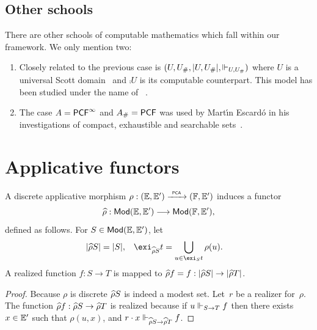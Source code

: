 \subsection{Other schools}
\label{sec:other-schools}

There are other schools of computable mathematics which fall within
our framework. We only mention two:
%
\begin{enumerate}
\item
  Closely related to the previous case is $(U, U_{\#}, |U, U_{\#}|, {\Vdash_{U, U_{\#}}})$ where
  $U$ is a universal Scott domain~ and $\comp{U}$ is
  its computable counterpart. This model has been studied under the
  name of ~.
\item
  The case $A = \mathsf{PCF}^\infty$ and $A_{\#} = \mathsf{PCF}$ was used by
  Mart{\'\i}n Escard\'o in his investigations of compact, exhaustible
  and searchable sets~.
\end{enumerate}

\section{Applicative functors}
\label{sec:applicative-functors}

\begin{proposition}
  \label{th:applicative_morphism_induce_functor}%
  A discrete applicative morphism $\rho: ({\mathbb{E}}, {\mathbb{E}'}) \xrightarrow{\scriptscriptstyle\mathsf{\ PCA\ }}{} ({\mathbb{F}},
  {\mathbb{E}'})$ induces a functor
  \begin{equation*}
     \widehat{\rho}: \mathsf{Mod}({\mathbb{E}}, {\mathbb{E}'}) \longrightarrow \mathsf{Mod}({\mathbb{F}}, {\mathbb{E}'}),
  \end{equation*}
  defined as follows. For $S \in \mathsf{Mod}({\mathbb{E}}, {\mathbb{E}'})$, let
  \begin{align*}
    |\ff{\rho} S| &= |S|,
    &
    \exi_{\ff{\rho} S} t &= \bigcup_{u \in \exi_S t} \rho(u).
  \end{align*}
  A realized function $f: S \to T$ is mapped to $\widehat{\rho} f = f:
  |\widehat{\rho} S| \to |\widehat{\rho} T|$.
\end{proposition}

\begin{proof}
  Because $\rho$ is discrete $\widehat{\rho} S$ is indeed a modest set.
  Let~$r$ be a realizer for~$\rho$. The function $\widehat{\rho} f :
  \widehat{\rho} S \to \widehat{\rho} T$ is realized because if $u \Vdash_{S \to T}
  f$ then there exists $x \in {\mathbb{E}'}$ such that $\rho(u, x)$, and $r
  \cdot x \Vdash_{\widehat{\rho} S \to \widehat{\rho} T} f$.
\end{proof}

